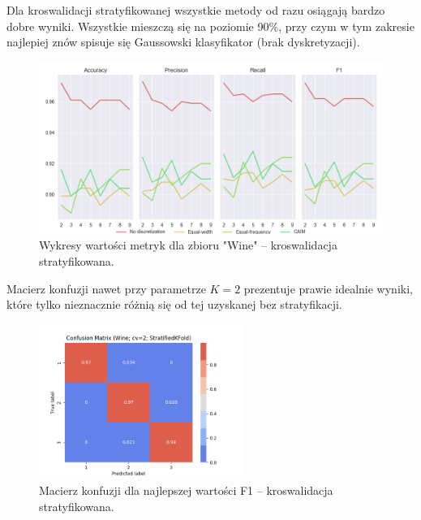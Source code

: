 \pagebreak
Dla kroswalidacji stratyfikowanej wszystkie metody od razu osiągają bardzo dobre wyniki.
Wszystkie mieszczą się na poziomie 90\%, przy czym w tym zakresie najlepiej znów spisuje się
Gaussowski klasyfikator (brak dyskretyzacji).


\begin{figure}[H]
\center
    \includegraphics[width=\textwidth]{img/cv_scores_stratifiedkfold/scoring_stratifiedkfold_wine.png}
    \caption{Wykresy wartości metryk dla zbioru "Wine" -- kroswalidacja stratyfikowana.}
\end{figure}

Macierz konfuzji nawet przy parametrze $K = 2$ prezentuje prawie idealnie wyniki, które tylko
nieznacznie różnią się od tej uzyskanej bez stratyfikacji.

\begin{figure}[H]
\center
    \includegraphics[width=0.6\textwidth]{img/conf_matrices/cm_Wine_cv2_StratifiedKFold.png}
    \caption{Macierz konfuzji dla najlepszej wartości F1 -- kroswalidacja stratyfikowana.}
\end{figure}


